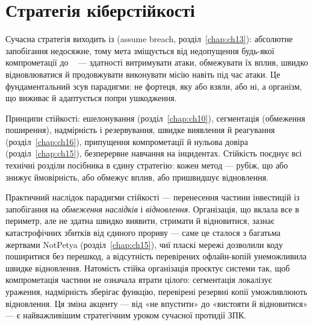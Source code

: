 \section{Стратегія кіберстійкості}\label{sec:ch17-resilience}

Сучасна стратегія виходить із  (assume breach, розділ~\ref{chap:ch13}): абсолютне запобігання недосяжне, тому мета зміщується від недопущення будь-якої компрометації до ~\cite{ch17:resilience} --- здатності витримувати атаки, обмежувати їх вплив, швидко відновлюватися й продовжувати виконувати місію навіть під час атаки. Це фундаментальний зсув парадигми: не фортеця, яку або взяли, або ні, а організм, що виживає й адаптується попри ушкодження.

\begin{tikzfig}
\end{tikzfig}

Принципи стійкості: ешелонування (розділ~\ref{chap:ch10}), сегментація (обмеження поширення), надмірність і резервування, швидке виявлення й реагування (розділ~\ref{chap:ch16}), припущення компрометації й нульова довіра (розділ~\ref{chap:ch15}), безперервне навчання на інцидентах. Стійкість поєднує всі технічні розділи посібника в єдину стратегію: кожен метод --- рубіж, що або знижує ймовірність, або обмежує вплив, або пришвидшує відновлення.

Практичний наслідок парадигми стійкості --- перенесення частини інвестицій із запобігання на \emph{обмеження наслідків} і \emph{відновлення}. Організація, що вклала все в периметр, але не здатна швидко виявити, стримати й відновитися, зазнає катастрофічних збитків від єдиного прориву --- саме це сталося з багатьма жертвами NotPetya (розділ~\ref{chap:ch15}), чиї пласкі мережі дозволили коду поширитися без перешкод, а відсутність перевірених офлайн-копій унеможливила швидке відновлення. Натомість стійка організація проєктує системи так, щоб компрометація частини не означала втрати цілого: сегментація локалізує ураження, надмірність зберігає функцію, перевірені резервні копії уможливлюють відновлення. Ця зміна акценту --- від «не впустити» до «вистояти й відновитися» --- є найважливішим стратегічним уроком сучасної протидії ЗПК.

